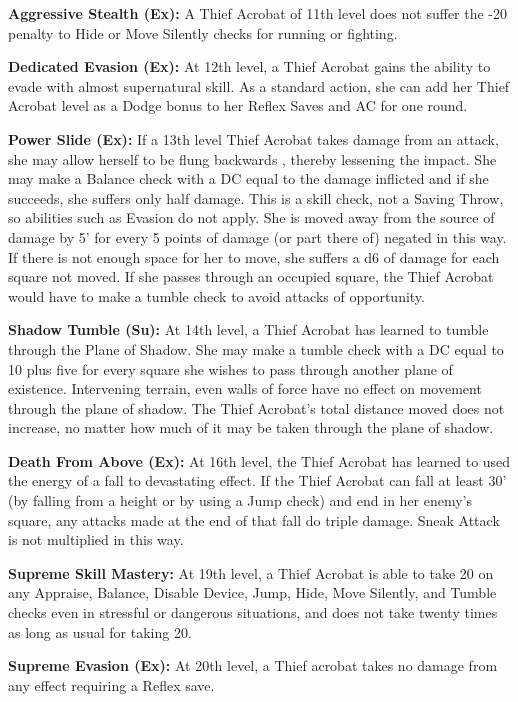 \documentclass[10pt]{article}
\newcommand{\ability}[2]{\smallskip \noindent \textbf{#1} #2}
\begin{document}
\ability{Aggressive Stealth (Ex):}{A Thief Acrobat of 11th level does not suffer the -20 penalty to Hide or Move Silently checks for running or fighting.}

\ability{Dedicated Evasion (Ex):}{At 12th level, a Thief Acrobat gains the ability to evade with almost supernatural skill. As a standard action, she can add her Thief Acrobat level as a Dodge bonus to her Reflex Saves and AC for one round.}

\ability{Power Slide (Ex):}{If a 13th level Thief Acrobat takes damage from an attack, she may allow herself to be flung backwards , thereby lessening the impact. She may make a Balance check with a DC equal to the damage inflicted and if she succeeds, she suffers only half damage. This is a skill check, not a Saving Throw, so abilities such as Evasion do not apply. She is moved away from the source of damage by 5' for every 5 points of damage (or part there of) negated in this way. If there is not enough space for her to move, she suffers a d6 of damage for each square not moved. If she passes through an occupied square, the Thief Acrobat would have to make a tumble check to avoid attacks of opportunity.}

\ability{Shadow Tumble (Su):}{At 14th level, a Thief Acrobat has learned to tumble through the Plane of Shadow. She may make a tumble check with a DC equal to 10 plus five for every square she wishes to pass through another plane of existence. Intervening terrain, even walls of force have no effect on movement through the plane of shadow. The Thief Acrobat's total distance moved does not increase, no matter how much of it may be taken through the plane of shadow.}

\ability{Death From Above (Ex):}{At 16th level, the Thief Acrobat has learned to used the energy of a fall to devastating effect. If the Thief Acrobat can fall at least 30' (by falling from a height or by using a Jump check) and end in her enemy's square, any attacks made at the end of that fall do triple damage. Sneak Attack is not multiplied in this way.}

\ability{Supreme Skill Mastery:}{At 19th level, a Thief Acrobat is able to take 20 on any Appraise, Balance, Disable Device, Jump, Hide, Move Silently, and Tumble checks even in stressful or dangerous situations, and does not take twenty times as long as usual for taking 20.}

\ability{Supreme Evasion (Ex):}{At 20th level, a Thief acrobat takes no damage from any effect requiring a Reflex save.}
\end{document}
